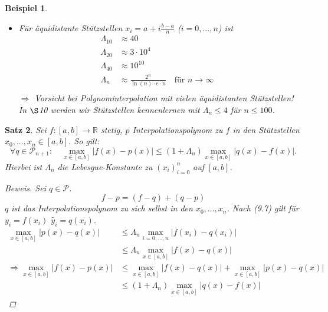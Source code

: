 \documentclass[12pt]{article}
\theoremstyle{break}
\newtheorem{theorem}{Satz}[subsection]
\newtheorem{example}[theorem]{Beispiel}
\begin{document}
\begin{example}
\begin{description}\item \end{description}
\begin{itemize}
  \item Für äquidistante Stützstellen $x_i = a + i\frac{b-a}{n}$ ($i=0,...,n$) ist 
    \begin{align*}
    \Lambda_{10} &\approx 40 &\\
    \Lambda_{20} &\approx 3 \cdot 10^4 &\\
    \Lambda_{40} &\approx 10^{10} &\\
    \Lambda_{n} &\approx \frac{2^n}{ \ln(n) \cdot e \cdot n} \quad \text{für } n \rightarrow \infty&\\
    \end{align*}
    $\Rightarrow$ Vorsicht bei Polynominterpolation mit vielen äquidistanten Stützstellen! \\
    In $\S$10 werden wir Stützstellen kennenlernen mit $\Lambda_n \leq 4$ für $n \leq 100$.
\end{itemize}
\end{example}

\begin{theorem}
Sei $f: [a,b] \rightarrow \mathbb{R}$ stetig, $p$ Interpolationspolynom zu $f$ in den Stützstellen $x_0,..., x_n \in [a,b]$. So gilt:
\[ \forall q \in \mathcal{P}_{n+1}: \quad \max_{x \in [a,b] } \vert f(x) -p(x) \vert \leq (1+ \Lambda_n) \max_{x \in [a,b]} \vert q(x) - f(x) \vert .\]
Hierbei ist $\Lambda_n$ die Lebesgue-Konstante zu $(x_i)_{i=0}^n$ auf $[a,b]$.
\begin{proof}[Beweis]
Sei $q \in \mathcal{P}$.
\[ f-p = (f-q) + (q-p)\]
$q$ ist das Interpolationspolynom zu sich selbst in den $x_0,..., x_n$. Nach (9.7) gilt für $y_i = f(x_i)$ $\tilde{y_i}  = q(x_i)$.
\begin{align*}
\max_{x \in [a,b]} \vert p(x) - q(x) \vert &\leq \Lambda_n \max_{i=0,...,n} \vert f(x_i) - q(x_i) \vert &\\
&\leq \Lambda_n \max_{x \in [a,b]} \vert f(x)-q(x) \vert &\\
\Rightarrow \max_{x \in [a,b]} \vert f(x) - p(x) \vert &\leq \max_{x \in [a,b]} \vert f(x)-q(x) \vert + \max_{x \in [a,b]} \vert p(x)-q(x) \vert &\\
&\leq (1+ \Lambda_n) \max_{x \in [a,b]} \vert q(x) - f(x) \vert 
\end{align*}
\end{proof}
\end{theorem}
\end{document}
